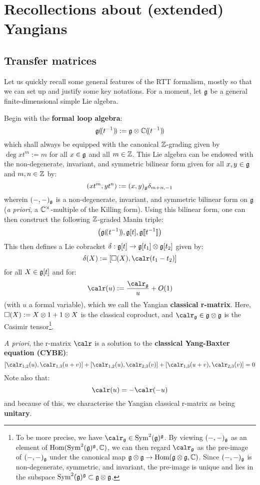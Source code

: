     \section{Recollections about (extended) Yangians}
        \subsection{Transfer matrices}
            Let us quickly recall some general features of the RTT formalism, mostly so that we can set up and justify some key notations. For a moment, let $\mathfrak{g}$ be a general finite-dimensional simple Lie algebra.
            
            Begin with the \textbf{formal loop algebra}:
                $$\g(\!(t^{-1})\!) := \g \tensor \bbC(\!(t^{-1})\!)$$
            which shall always be equipped with the canonical $\mathbb{Z}$-grading given by $\deg xt^m := m$ for all $x \in \mathfrak{g}$ and all $m \in \mathbb{Z}$. This Lie algebra can be endowed with the non-degenerate, invariant, and symmetric bilinear form given for all $x, y \in \mathfrak{g}$ and $m, n \in \mathbb{Z}$ by:
                $$(xt^m, yt^n) := (x, y)_{\mathfrak{g}} \delta_{m + n, -1}$$
            wherein $(-, -)_{\mathfrak{g}}$ is a non-degenerate, invariant, and symmetric bilinear form on $\mathfrak{g}$ (\textit{a priori}, a $\bbC^{\x}$-multiple of the Killing form). Using this bilinear form, one can then construct the following $\mathbb{Z}$-graded Manin triple:
                $$\left( \mathfrak{g}(\!(t^{-1})\!), \mathfrak{g}[t], \mathfrak{g}[\![t^{-1}]\!] \right)$$
            This then defines a Lie cobracket $\delta: \g[t] \to \g[t_1] \tensor \g[t_2]$ given by:
                $$\delta( X ) := [\Box(X), \calr(t_1 - t_2)]$$
            for all $X \in \mathfrak{g}[t]$ and for:
                $$\calr(u) := \frac{\calr_{\g}}{u} + O(1)$$
            (with $u$ a formal variable), which we call the Yangian \textbf{classical r-matrix}. Here, $\Box(X) := X \tensor 1 + 1 \tensor X$ is the  classical coproduct, and $\calr_{\g} \in \g \tensor \g$ is the Casimir tensor\footnote{To be more precise, we have $\calr_{\g} \in \Sym^2(\g)^{\g}$. By viewing $(-, -)_{\mathfrak{g}}$ as an element of $\mathrm{Hom}( \mathrm{Sym}^2(\mathfrak{g})^{\mathfrak{g}}, \mathbb{C} )$, we can then regard $\calr_{\g}$ as the pre-image of $(-, -)_{\mathfrak{g}}$ under the canonical map $\g \tensor \g \to \Hom(\g \tensor \g, \bbC)$. Since $(-, -)_{\mathfrak{g}}$ is non-degenerate, symmetric, and invariant, the pre-image is unique and lies in the subspace $\Sym^2(\g)^{\g} \subset \g \tensor \g$.}.
            
            \textit{A priori}, the r-matrix $\calr$ is a solution to the \textbf{classical Yang-Baxter equation (CYBE)}:
                \begin{equation} \label{equation: CYBE}
                    [\calr_{1, 2}(u), \calr_{1, 3}(u + v)] + [\calr_{1, 2}(u), \calr_{2, 3}(v)] + [\calr_{1, 3}(u + v), \calr_{2, 3}(v)] = 0
                \end{equation}
            Note also that:
                \begin{equation} \label{equation: classical_unitarity}
                    \calr(u) = -\calr(-u)
                \end{equation}
            and because of this, we characterise the Yangian classical r-matrix as being \textbf{unitary}.
            
